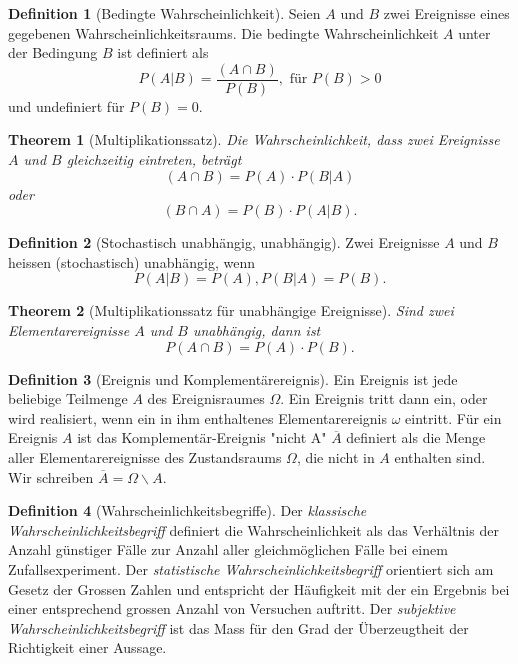 \documentclass{article}
\newtheorem{theorem}{Theorem}
\theoremstyle{definition}
\newtheorem{definition}{Definition}
\theoremstyle{exercise}
\theoremstyle{solution}
\theoremstyle{lemma}
\begin{document}
\begin{definition}[Bedingte Wahrscheinlichkeit]
Seien \(A\) und \(B\) zwei Ereignisse eines gegebenen Wahrscheinlichkeitsraums. Die bedingte Wahrscheinlichkeit \(A\) unter der Bedingung \(B\) ist definiert als
\[
P(A|B)=\frac{(A\cap B)}{P(B)}, \text{ für } P(B)>0
\]
und undefiniert für \(P(B)=0\).
\end{definition}

\begin{theorem}[Multiplikationssatz]
Die Wahrscheinlichkeit, dass zwei Ereignisse \(A\) und \(B\) gleichzeitig eintreten, beträgt
\[
(A\cap B)=P(A)\cdot P(B|A)
\]
oder
\[
(B\cap A)=P(B) \cdot P(A|B).
\]
\end{theorem}

\begin{definition}[Stochastisch unabhängig, unabhängig]
Zwei Ereignisse \(A\) und \(B\) heissen (stochastisch) unabhängig, wenn
\[
P(A|B)=P(A), P(B|A)=P(B).
\]
\end{definition}

\begin{theorem}[Multiplikationssatz für unabhängige Ereignisse]
Sind zwei Elementarereignisse \(A\) und \(B\) unabhängig, dann ist
\[
P(A\cap B)=P(A)\cdot P(B).
\]
\end{theorem}


\begin{definition}[Ereignis und Komplementärereignis]
Ein Ereignis ist jede beliebige Teilmenge \(A\) des Ereignisraumes $\Omega$. Ein Ereignis tritt dann ein, oder wird realisiert, wenn ein in ihm enthaltenes Elementarereignis $\omega$ eintritt. Für ein Ereignis $A$ ist das Komplementär-Ereignis "nicht A" $\overline{A}$ definiert als die Menge aller Elementarereignisse des Zustandsraums $\Omega$, die nicht in $A$ enthalten sind. Wir schreiben $\overline{A}=\Omega \backslash A$.
\end{definition}

\begin{definition}[Wahrscheinlichkeitsbegriffe]
Der \textit{klassische Wahrscheinlichkeitsbegriff} definiert die Wahrscheinlichkeit als das Verhältnis der Anzahl günstiger Fälle zur Anzahl aller gleichmöglichen Fälle bei einem Zufallsexperiment.  Der \textit{statistische Wahrscheinlichkeitsbegriff} orientiert sich am Gesetz der Grossen Zahlen und entspricht der Häufigkeit mit der ein Ergebnis bei einer entsprechend grossen Anzahl von Versuchen auftritt. Der \textit{subjektive Wahrscheinlichkeitsbegriff} ist das Mass für den Grad der Überzeugtheit der Richtigkeit einer Aussage.
\end{definition}
\end{document}
